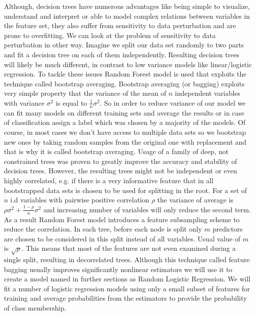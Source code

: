 \documentclass[12pt, wide]{mwart}
\begin{document}
Although, decision trees have numerous advantages like being simple to visualize, understand and interpret or able to model complex relations between variables in the feature set, they also suffer from sensitivity to data perturbation and are prone to overfitting. We can look at the problem of sensitivity to data perturbation in other way. Imagine we split our data set randomly to two parts and fit a decision tree on each of them independently. Resulting decision trees will likely be much different, in contrast to low variance models like linear/logistic regression. To tackle these issues Random Forest model is used that exploits the technique called bootstrap averaging. Bootstrap averaging (or bagging) exploits very simple property that the variance of the mean of $n$ independent variables with variance $\sigma^2$ is equal to $\frac{1}{n}\sigma^2$. So in order to reduce variance of our model we can fit many models on different training sets and average the results or in case of classification assign a label which was chosen by a majority of the models. Of course, in most cases we don't have access to multiple data sets so we bootstrap new ones by taking random samples from the original one with replacement and that is why it is called bootstrap averaging. Usage of a family of deep, not constrained trees was proven to greatly improve the accuracy and stability of decision trees. However, the resulting trees might not be independent or even highly correlated, e.g. if there is a very informative feature that in all bootstrapped data sets is chosen to be used for splitting in the root. For a set of $n$ i.d variables with pairwise positive correlation $\rho$ the variance of average is $\rho \sigma^2 + \frac{1-\rho}{n}\sigma^2$ and increasing number of variables will only reduce the second term. As a result Random Forest model introduces a feature subsampling scheme to reduce the correlation. In each tree, before each node is split only $m$ predictors are chosen to be considered in this split instead of all variables. Usual value of $m$ is  $\sqrt{p}$. This means that most of the features are not even examined during a single split, resulting in decorrelated trees. Although this technique called feature bagging usually improves significantly nonlinear estimators we will use it to create a model named in further sections as Random Logistic Regression. We will fit a number of logistic regression models using only a small subset of features for training and average probabilities from the estimators to provide the probability of class membership.
\end{document}
